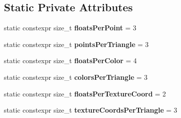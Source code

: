 \subsection*{Static Private Attributes}
\begin{DoxyCompactItemize}
\item 
\hypertarget{classMesh__t_a4f2c7b37ff15ffe73988ef207240a509}{static constexpr size\+\_\+t {\bfseries floats\+Per\+Point} = 3}\label{classMesh__t_a4f2c7b37ff15ffe73988ef207240a509}

\item 
\hypertarget{classMesh__t_a3bf64bee9bec75179cc165d29049ff0b}{static constexpr size\+\_\+t {\bfseries points\+Per\+Triangle} = 3}\label{classMesh__t_a3bf64bee9bec75179cc165d29049ff0b}

\item 
\hypertarget{classMesh__t_a7ae7a68747f222dac660b2f3dde25cf9}{static constexpr size\+\_\+t {\bfseries floats\+Per\+Color} = 4}\label{classMesh__t_a7ae7a68747f222dac660b2f3dde25cf9}

\item 
\hypertarget{classMesh__t_a00cbfa82f20e31570dfc9a1878258d57}{static constexpr size\+\_\+t {\bfseries colors\+Per\+Triangle} = 3}\label{classMesh__t_a00cbfa82f20e31570dfc9a1878258d57}

\item 
\hypertarget{classMesh__t_a4b8a3e8605f1ce517821ffb0192368e7}{static constexpr size\+\_\+t {\bfseries floats\+Per\+Texture\+Coord} = 2}\label{classMesh__t_a4b8a3e8605f1ce517821ffb0192368e7}

\item 
\hypertarget{classMesh__t_ae3104029e1f9647164ca4a9f83babecb}{static constexpr size\+\_\+t {\bfseries texture\+Coords\+Per\+Triangle} = 3}\label{classMesh__t_ae3104029e1f9647164ca4a9f83babecb}

\end{DoxyCompactItemize}

